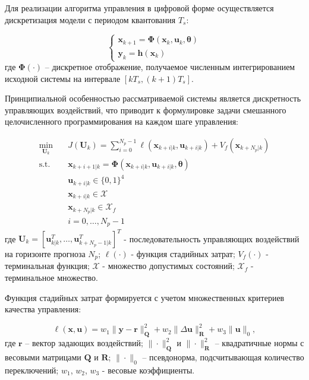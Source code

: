 Для реализации алгоритма управления в цифровой форме осуществляется дискретизация модели с периодом квантования $T_s$:

\begin{equation}
\begin{cases}
\mathbf{x}_{k+1} = \boldsymbol{\Phi}(\mathbf{x}_k, \mathbf{u}_k, \boldsymbol{\theta}) \\
\mathbf{y}_k = \mathbf{h}(\mathbf{x}_k)
\end{cases}
\end{equation}
где $\boldsymbol{\Phi}(\cdot)$ -- дискретное отображение, получаемое численным интегрированием исходной системы на интервале $[kT_s, (k+1)T_s]$.

Принципиальной особенностью рассматриваемой системы является дискретность управляющих воздействий,
что приводит к формулировке задачи смешанного целочисленного программирования на каждом шаге управления:

\begin{equation}
\begin{aligned}
\min_{\mathbf{U}_k} \quad & J(\mathbf{U}_k) = \sum_{i=0}^{N_p-1} \ell(\mathbf{x}_{k+i|k}, \mathbf{u}_{k+i|k}) + V_f(\mathbf{x}_{k+N_p|k}) \\
\text{s.t.} \quad & \mathbf{x}_{k+i+1|k} = \boldsymbol{\Phi}(\mathbf{x}_{k+i|k}, \mathbf{u}_{k+i|k}, \boldsymbol{\theta}) \\
& \mathbf{u}_{k+i|k} \in \{0,1\}^4 \\
& \mathbf{x}_{k+i|k} \in \mathcal{X} \\
& \mathbf{x}_{k+N_p|k} \in \mathcal{X}_f \\
& i = 0,\ldots,N_p-1
\end{aligned}
\end{equation}
где $\mathbf{U}_k = [\mathbf{u}_{k|k}^T, \ldots, \mathbf{u}_{k+N_p-1|k}^T]^T$ - последовательность управляющих воздействий на горизонте прогноза $N_p$;
$\ell(\cdot)$ - функция стадийных затрат;
$V_f(\cdot)$ - терминальная функция;
$\mathcal{X}$ - множество допустимых состояний;
$\mathcal{X}_f$ - терминальное множество.

Функция стадийных затрат формируется с учетом множественных критериев качества управления:

\begin{equation}
\ell(\mathbf{x}, \mathbf{u}) = w_1\|\mathbf{y} - \mathbf{r}\|_{\mathbf{Q}}^2 + w_2\|\Delta\mathbf{u}\|_{\mathbf{R}}^2 + w_3\|\mathbf{u}\|_0,
\end{equation}
где $\mathbf{r}$ -- вектор задающих воздействий;
$\|\cdot\|_{\mathbf{Q}}^2$ и $\|\cdot\|_{\mathbf{R}}^2$ -- квадратичные нормы с весовыми матрицами $\mathbf{Q}$ и $\mathbf{R}$;
$\|\cdot\|_0$ -- псевдонорма, подсчитывающая количество переключений;
$w_1$, $w_2$, $w_3$ - весовые коэффициенты.

